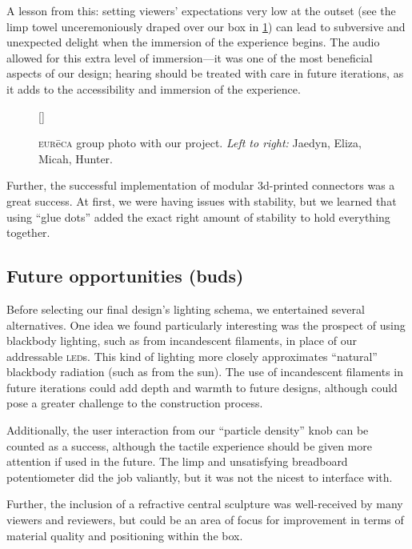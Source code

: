 \documentclass[12pt]{article}
\begin{document}
    A lesson from this: setting viewers' expectations very low at the outset (see the limp towel unceremoniously draped over our box in \cref{fig:eureca}) can lead to subversive and unexpected delight when the immersion of the experience begins. The audio allowed for this extra level of immersion—it was one of the most beneficial aspects of our design; hearing should be treated with care in future iterations, as it adds to the accessibility and immersion of the experience.
    \begin{figure}[h]
        [\FBwidth]
        {\caption{\textsc{eur}ē\textsc{ca} group photo with our project. \textit{Left to right:} Jaedyn, Eliza, Micah, Hunter.}\label{fig:eureca}}
        {}
    \end{figure}

    Further, the successful implementation of modular 3d-printed connectors was a great success. At first, we were having issues with stability, but we learned that using ``glue dots'' added the exact right amount of stability to hold everything together.
    
    \subsection{Future opportunities (buds)}
    Before selecting our final design's lighting schema, we entertained several alternatives. One idea we found particularly interesting was the prospect of using blackbody lighting, such as from incandescent filaments, in place of our addressable \textsc{led}s. This kind of lighting more closely approximates ``natural'' blackbody radiation (such as from the sun). The use of incandescent filaments in future iterations could add depth and warmth to future designs, although could pose a greater challenge to the construction process. 

    Additionally, the user interaction from our ``particle density'' knob can be counted as a success, although the tactile experience should be given more attention if used in the future. The limp and unsatisfying breadboard potentiometer did the job valiantly, but it was not the nicest to interface with.
    
    Further, the inclusion of a refractive central sculpture was well-received by many viewers and reviewers, but could be an area of focus for improvement in terms of material quality and positioning within the box.
    
\end{document}
